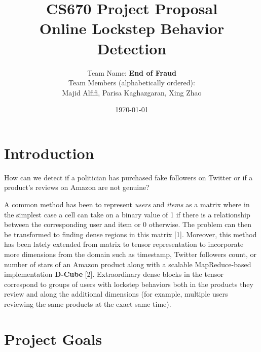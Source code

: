 \documentclass[12pt]{article}
\begin{document}
 
 
\title{CS670 Project Proposal\\Online Lockstep Behavior Detection}
\author{
Team Name: \textbf{End of Fraud}\\[2ex]
\small{Team Members (alphabetically ordered):}\\
Majid Alfifi, Parisa Kaghazgaran,  Xing Zhao
}

\date{\today}
 
\maketitle
 
 
\section{Introduction}
 

How can we detect if a politician has purchased fake followers on Twitter or if a product's reviews on Amazon are not genuine?

A common method has been to represent \emph{users} and \emph{items} as a matrix where in the simplest case a cell can take on a binary value of 1 if there is a relationship between the corresponding user and item or 0 otherwise. The problem can then be transformed to finding dense regions in this matrix [1]. Moreover, this method has been lately extended from matrix to tensor representation to incorporate more dimensions from the domain such as timestamp, Twitter followers count, or number of stars of an Amazon product along with a scalable MapReduce-based implementation \textbf{D-Cube} [2]. Extraordinary dense blocks in the tensor correspond to groups of users with lockstep behaviors both in the products they review and along the additional dimensions (for example, multiple users reviewing the same products at the exact same time). 


\section{Project Goals}
\end{document}
